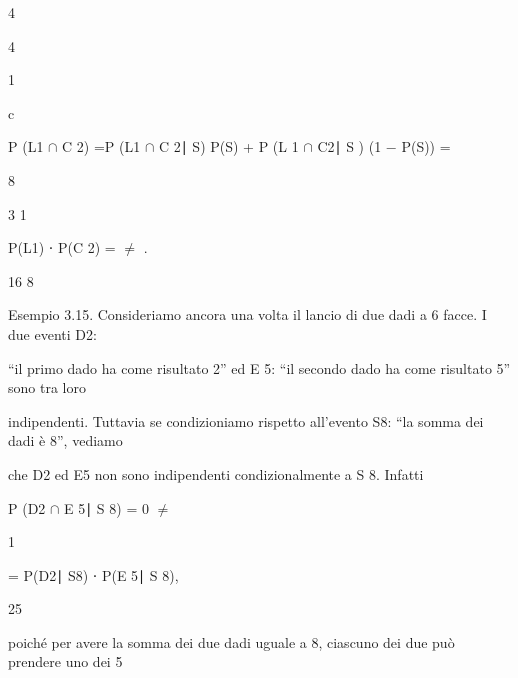 \documentclass[a4paper,portrait,12pt]{article}
\begin{document}
4


4


1


\begin{flushleft}
c
\end{flushleft}


\begin{flushleft}
P (L1 $\cap$ C 2) =P (L1 $\cap$ C 2∣ S) P(S) + P (L 1 $\cap$ C2∣ S ) (1 $-$ P(S)) =
\end{flushleft}


8


3 1


\begin{flushleft}
P(L1) ⋅ P(C 2) = $\neq$ .
\end{flushleft}


16 8


\begin{flushleft}
Esempio 3.15. Consideriamo ancora una volta il lancio di due dadi a 6 facce. I due eventi D2:
\end{flushleft}


\begin{flushleft}
``il primo dado ha come risultato 2'' ed E 5: ``il secondo dado ha come risultato 5'' sono tra loro
\end{flushleft}


\begin{flushleft}
indipendenti. Tuttavia se condizioniamo rispetto all'evento S8: ``la somma dei dadi \`{e} 8'', vediamo
\end{flushleft}


\begin{flushleft}
che D2 ed E5 non sono indipendenti condizionalmente a S 8. Infatti
\end{flushleft}


\begin{flushleft}
P (D2 $\cap$ E 5∣ S 8) = 0 $\neq$
\end{flushleft}





1


\begin{flushleft}
= P(D2∣ S8) ⋅ P(E 5∣ S 8),
\end{flushleft}


25





\begin{flushleft}
poich\'{e} per avere la somma dei due dadi uguale a 8, ciascuno dei due pu\`{o} prendere uno dei 5
\end{flushleft}
\end{document}
